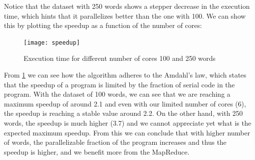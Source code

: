 Notice that the dataset with 250 words shows a stepper decrease in the
execution time, which hints that it parallelizes better than the one with 100.
We can show this by plotting the speedup as a function of the number of cores:

\begin{figure}[H]
    \texttt{[image: speedup]}
    \caption{Execution time for different number of cores 100 and 250 words}%
    \label{fig:speedup}%
\end{figure}

From \cref{fig:speedup} we can see how the algorithm adheres to the Amdahl's
law, which states that the speedup of a program is limited by the fraction of
serial code in the program. With the dataset of 100 words, we can see that we
are reaching a maximum speedup of around 2.1 and even with our limited
number of cores (6), the speedup is reaching a stable value around 2.2. On the
other hand, with 250 words, the speedup is much higher (3.7) and we cannot appreciate
yet what is the expected maximum speedup. From this we can conclude that with
higher number of words, the parallelizable fraction of the program increases
and thus the speedup is higher, and we benefit more from the MapReduce.


